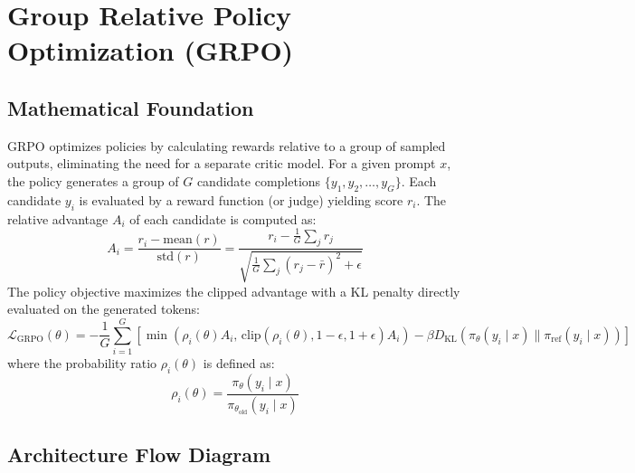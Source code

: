 \documentclass{article}
\begin{document}
\newpage
\section{Group Relative Policy Optimization (GRPO)}

\subsection{Mathematical Foundation}
GRPO optimizes policies by calculating rewards relative to a group of sampled outputs, eliminating the need for a separate critic model.
For a given prompt $x$, the policy generates a group of $G$ candidate completions $\{y_1, y_2, \dots, y_G\}$. Each candidate $y_i$ is evaluated by a reward function (or judge) yielding score $r_i$.
The relative advantage $A_i$ of each candidate is computed as:
\begin{equation}
  A_i = \frac{r_i - \text{mean}(r)}{\text{std}(r)} = \frac{r_i - \frac{1}{G}\sum_j r_j}{\sqrt{\frac{1}{G}\sum_j (r_j - \bar{r})^2 + \epsilon}}
\end{equation}
The policy objective maximizes the clipped advantage with a KL penalty directly evaluated on the generated tokens:
\begin{equation}
  \mathcal{L}_{\text{GRPO}}(\theta) = -\frac{1}{G} \sum_{i=1}^G \left[ \min\left( \rho_i(\theta) A_i, \, \text{clip}(\rho_i(\theta), 1-\epsilon, 1+\epsilon) A_i \right) - \beta D_{\text{KL}}\left( \pi_\theta(y_i \mid x) \parallel \pi_{\text{ref}}(y_i \mid x) \right) \right]
\end{equation}
where the probability ratio $\rho_i(\theta)$ is defined as:
\begin{equation}
  \rho_i(\theta) = \frac{\pi_\theta(y_i \mid x)}{\pi_{\theta_{\text{old}}}(y_i \mid x)}
\end{equation}

\subsection{Architecture Flow Diagram}
\end{document}
